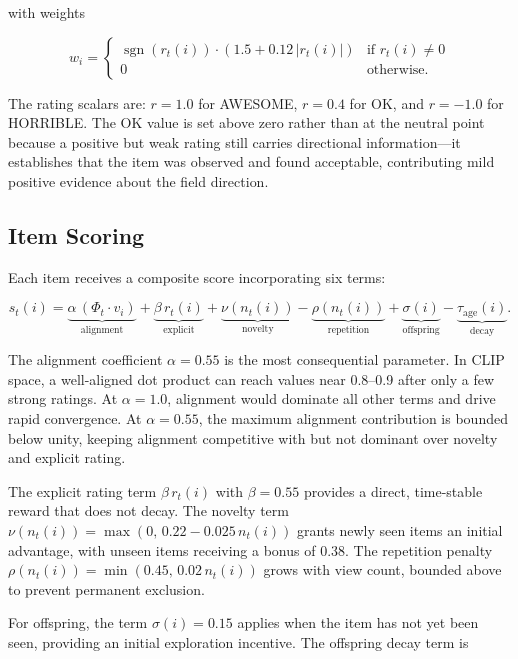 \documentclass[12pt, a4paper]{article}
\theoremstyle{definition}
\begin{document}
with weights

\begin{equation}
w_i = \begin{cases} \operatorname{sgn}(r_t(i))\cdot(1.5 + 0.12\,|r_t(i)|) & \text{if } r_t(i) \neq 0 \\ 0 & \text{otherwise.} \end{cases}
\end{equation}

The rating scalars are: $r = 1.0$ for AWESOME, $r = 0.4$ for OK, and $r = -1.0$ for HORRIBLE. The OK value is set above zero rather than at the neutral point because a positive but weak rating still carries directional information---it establishes that the item was observed and found acceptable, contributing mild positive evidence about the field direction.

\subsection{Item Scoring}

Each item receives a composite score incorporating six terms:

\begin{equation}
s_t(i) = \underbrace{\alpha\,(\Phi_t \cdot v_i)}_{\text{alignment}} + \underbrace{\beta\, r_t(i)}_{\text{explicit}} + \underbrace{\nu(n_t(i))}_{\text{novelty}} - \underbrace{\rho(n_t(i))}_{\text{repetition}} + \underbrace{\sigma(i)}_{\text{offspring}} - \underbrace{\tau_{\mathrm{age}}(i)}_{\text{decay}}.
\end{equation}

The alignment coefficient $\alpha = 0.55$ is the most consequential parameter. In CLIP space, a well-aligned dot product can reach values near 0.8--0.9 after only a few strong ratings. At $\alpha = 1.0$, alignment would dominate all other terms and drive rapid convergence. At $\alpha = 0.55$, the maximum alignment contribution is bounded below unity, keeping alignment competitive with but not dominant over novelty and explicit rating.

The explicit rating term $\beta\, r_t(i)$ with $\beta = 0.55$ provides a direct, time-stable reward that does not decay. The novelty term $\nu(n_t(i)) = \max(0,\,0.22 - 0.025\,n_t(i))$ grants newly seen items an initial advantage, with unseen items receiving a bonus of 0.38. The repetition penalty $\rho(n_t(i)) = \min(0.45,\,0.02\,n_t(i))$ grows with view count, bounded above to prevent permanent exclusion.

For offspring, the term $\sigma(i) = 0.15$ applies when the item has not yet been seen, providing an initial exploration incentive. The offspring decay term is
\end{document}
